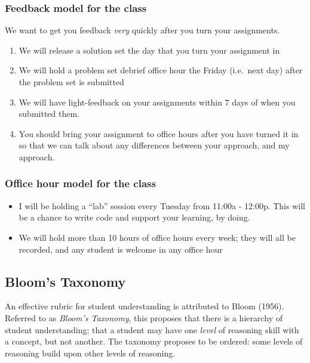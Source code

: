\documentclass[
]{article}
\providecommand{\tightlist}{%
  \setlength{\itemsep}{0pt}\setlength{\parskip}{0pt}}
\theoremstyle{definition}
\theoremstyle{definition}
\theoremstyle{definition}
\theoremstyle{definition}
\theoremstyle{remark}
\begin{document}
\subsubsection{Feedback model for the class}\label{feedback-model-for-the-class}

We want to get you feedback \emph{very} quickly after you turn your assignments.

\begin{enumerate}
\def\labelenumi{\arabic{enumi}.}
\tightlist
\item
  We will release a solution set the day that you turn your assignment in
\item
  We will hold a problem set debrief office hour the Friday (i.e.~next day) after the problem set is submitted
\item
  We will have light-feedback on your assignments within 7 days of when you submitted them.
\item
  You should bring your assignment to office hours after you have turned it in so that we can talk about any differences between your approach, and my approach.
\end{enumerate}

\subsubsection{Office hour model for the class}\label{office-hour-model-for-the-class}

\begin{itemize}
\tightlist
\item
  I will be holding a ``lab'' session every Tuesday from 11:00a - 12:00p. This will be a chance to write code and support your learning, by doing.
\item
  We will hold more than 10 hours of office hours every week; they will all be recorded, and any student is welcome in any office hour
\end{itemize}

\subsection*{Bloom's Taxonomy}\label{blooms-taxonomy}

An effective rubric for student understanding is attributed to Bloom (1956). Referred to as \emph{Bloom's Taxonomy}, this proposes that there is a hierarchy of student understanding; that a student may have one \emph{level} of reasoning skill with a concept, but not another. The taxonomy proposes to be ordered: some levels of reasoning build upon other levels of reasoning.
\end{document}
